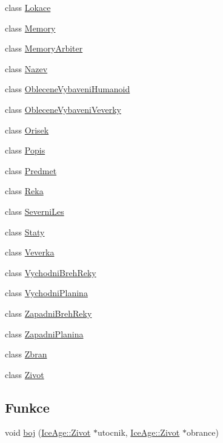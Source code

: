 \begin{DoxyCompactItemize}
class \hyperlink{classIceAge_1_1Lokace}{Lokace}
\item 
class \hyperlink{classIceAge_1_1Memory}{Memory}
\item 
class \hyperlink{classIceAge_1_1MemoryArbiter}{Memory\+Arbiter}
\item 
class \hyperlink{classIceAge_1_1Nazev}{Nazev}
\item 
class \hyperlink{classIceAge_1_1ObleceneVybaveniHumanoid}{Oblecene\+Vybaveni\+Humanoid}
\item 
class \hyperlink{classIceAge_1_1ObleceneVybaveniVeverky}{Oblecene\+Vybaveni\+Veverky}
\item 
class \hyperlink{classIceAge_1_1Orisek}{Orisek}
\item 
class \hyperlink{classIceAge_1_1Popis}{Popis}
\item 
class \hyperlink{classIceAge_1_1Predmet}{Predmet}
\item 
class \hyperlink{classIceAge_1_1Reka}{Reka}
\item 
class \hyperlink{classIceAge_1_1SeverniLes}{Severni\+Les}
\item 
class \hyperlink{classIceAge_1_1Staty}{Staty}
\item 
class \hyperlink{classIceAge_1_1Veverka}{Veverka}
\item 
class \hyperlink{classIceAge_1_1VychodniBrehReky}{Vychodni\+Breh\+Reky}
\item 
class \hyperlink{classIceAge_1_1VychodniPlanina}{Vychodni\+Planina}
\item 
class \hyperlink{classIceAge_1_1ZapadniBrehReky}{Zapadni\+Breh\+Reky}
\item 
class \hyperlink{classIceAge_1_1ZapadniPlanina}{Zapadni\+Planina}
\item 
class \hyperlink{classIceAge_1_1Zbran}{Zbran}
\item 
class \hyperlink{classIceAge_1_1Zivot}{Zivot}
\end{DoxyCompactItemize}
\subsection*{Funkce}
\begin{DoxyCompactItemize}
\item 
void \hyperlink{namespaceIceAge_a2c6b97286bcd54e3ecf2fdc335460e90}{boj} (\hyperlink{classIceAge_1_1Zivot}{Ice\+Age\+::\+Zivot} $\ast$utocnik, \hyperlink{classIceAge_1_1Zivot}{Ice\+Age\+::\+Zivot} $\ast$obrance)
\end{DoxyCompactItemize}



